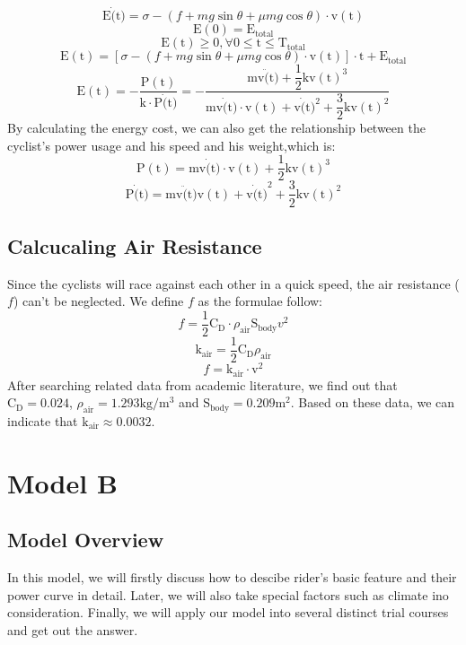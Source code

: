 \documentclass{article}
\begin{document}
	$$\mathrm{E}\dot(\mathrm{t})=\sigma-\left(f+mg\sin\theta+\mu mg\cos \theta\right)\cdot \mathrm{v}
	(\mathrm{t})$$
	$$\mathrm{E}(0)=\mathrm{E}_\mathrm{total}$$
	$$\mathrm{E}(\mathrm{t})\geq0, \forall 0 \leq \mathrm{t} \leq \mathrm{T}_\mathrm{total}$$
	$$\mathrm{E}(\mathrm{t})=\left[\sigma-\left(f+mg\sin \theta +\mu mg \cos \theta \right)\cdot \mathrm{v}(\mathrm{t})\right]\cdot \mathrm{t}+\mathrm{E}_\mathrm{total}$$
	$$\mathrm{E}(\mathrm{t})=-\dfrac{\mathrm{P}(\mathrm{t})}{\mathrm{k}\cdot \mathrm{P}\dot(\mathrm{t})}=-\dfrac{\mathrm{m}\mathrm{v}\ddot(\mathrm{t})+\dfrac{1}{2}\mathrm{k}{\mathrm{v}(\mathrm{t})}^3}{\mathrm{m}\mathrm{v}\dot(\mathrm{t})\cdot\mathrm{v}(\mathrm{t})+\mathrm{v}\dot(\mathrm{t})^2+\dfrac{3}{2}\mathrm{k}{\mathrm{v}(\mathrm{t})}^2}$$
	By calculating the energy cost, we can also get the relationship between the cyclist's power usage and his speed and his weight,which is:
	$$\mathrm{P}(\mathrm{t})=\mathrm{m}\mathrm{v}\dot(\mathrm{t})\cdot \mathrm{v}(\mathrm{t})+\dfrac{1}{2}\mathrm{k}{\mathrm{v}(\mathrm{t})}^3$$
	$$\mathrm{P}\dot(\mathrm{t})=\mathrm{m}\mathrm{v}\ddot(\mathrm{t})\mathrm{v}(\mathrm{t})+{\mathrm{v}\dot(\mathrm{t})}^2+\dfrac{3}{2}\mathrm{k}{\mathrm{v}(\mathrm{t})}^2$$
	\subsection{Calcucaling Air Resistance}
	Since the cyclists will race against each other in a quick speed, the air resistance ($f$) can't be neglected. We define $f$ as the formulae follow:
	$$f=\dfrac{1}{2} \mathrm{C}_\mathrm{D} \cdot \rho_\mathrm{air} \mathrm{S}_\mathrm{body} v^2$$
	$$\mathrm{k}_\mathrm{air}=\dfrac{1}{2} \mathrm{C}_\mathrm{D} \rho_\mathrm{air}$$
	$$f=\mathrm{k}_\mathrm{air}\cdot \mathrm{v}^2$$
	After searching related data from academic literature, we find out that $\mathrm{C}_\mathrm{D}=0.024$, $\rho_\mathrm{air}=1.293 \mathrm{kg/}\mathrm{m}^3$ and $\mathrm{S}_\mathrm{body}=0.209 \mathrm{m}^2$. Based on these data, we can indicate that $\mathrm{k}_\mathrm{air}\approx0.0032$.
	\section{Model B}
	\subsection{Model Overview}
	In this model, we will firstly discuss how to descibe rider's basic feature and their power curve in detail. Later, we will also take special factors such as climate ino consideration. Finally, we will apply our model into several distinct trial courses and get out the answer.
\end{document}
